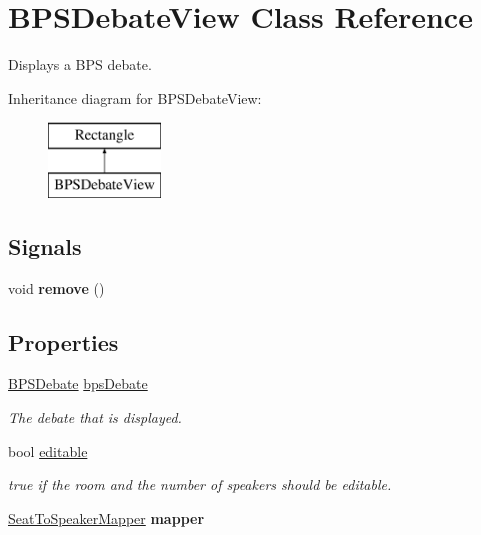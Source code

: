 \hypertarget{classBPSDebateView}{\section{B\-P\-S\-Debate\-View Class Reference}
\label{classBPSDebateView}
}


Displays a B\-P\-S debate.  


Inheritance diagram for B\-P\-S\-Debate\-View\-:\begin{figure}[H]
\begin{center}
\leavevmode
\includegraphics[height=2.000000cm]{classBPSDebateView}
\end{center}
\end{figure}
\subsection*{Signals}
\begin{DoxyCompactItemize}
\item 
\hypertarget{classBPSDebateView_af195c1b8ab918af612d86c74604f75cc}{void {\bfseries remove} ()}\label{classBPSDebateView_af195c1b8ab918af612d86c74604f75cc}

\end{DoxyCompactItemize}
\subsection*{Properties}
\begin{DoxyCompactItemize}
\item 
\hypertarget{classBPSDebateView_a2f4074285d7387aeb0fe55208d1f9b83}{\hyperlink{classBPSDebate}{B\-P\-S\-Debate} \hyperlink{classBPSDebateView_a2f4074285d7387aeb0fe55208d1f9b83}{bps\-Debate}}\label{classBPSDebateView_a2f4074285d7387aeb0fe55208d1f9b83}

\begin{DoxyCompactList}\small\item\em The debate that is displayed. \end{DoxyCompactList}\item 
\hypertarget{classBPSDebateView_a42784dfc74b99c528a9ee34357b27138}{bool \hyperlink{classBPSDebateView_a42784dfc74b99c528a9ee34357b27138}{editable}}\label{classBPSDebateView_a42784dfc74b99c528a9ee34357b27138}

\begin{DoxyCompactList}\small\item\em {\ttfamily true} if the room and the number of speakers should be editable. \end{DoxyCompactList}\item 
\hypertarget{classBPSDebateView_a10e5a3c749277df81a6ba90df18599b0}{\hyperlink{classSeatToSpeakerMapper}{Seat\-To\-Speaker\-Mapper} {\bfseries mapper}}\label{classBPSDebateView_a10e5a3c749277df81a6ba90df18599b0}

\end{DoxyCompactItemize}


